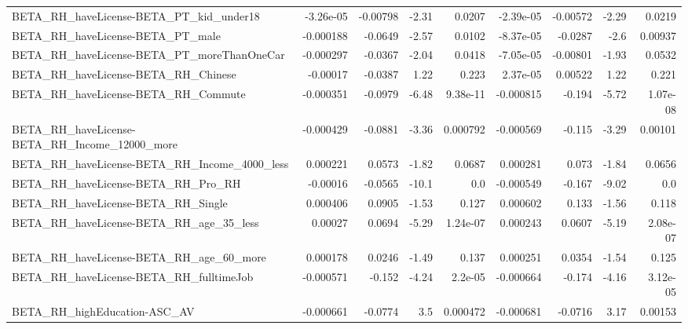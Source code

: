 \begin{tabular}{lrrrrrrrr}
BETA\_RH\_haveLicense-BETA\_PT\_kid\_under18            &   -3.26e-05 &     -0.00798 &     -2.31 &   0.0207 &  -2.39e-05 &    -0.00572 &        -2.29 &        0.0219 \\
BETA\_RH\_haveLicense-BETA\_PT\_male                   &   -0.000188 &      -0.0649 &     -2.57 &   0.0102 &  -8.37e-05 &     -0.0287 &         -2.6 &       0.00937 \\
BETA\_RH\_haveLicense-BETA\_PT\_moreThanOneCar         &   -0.000297 &      -0.0367 &     -2.04 &   0.0418 &  -7.05e-05 &    -0.00801 &        -1.93 &        0.0532 \\
BETA\_RH\_haveLicense-BETA\_RH\_Chinese                &    -0.00017 &      -0.0387 &      1.22 &    0.223 &   2.37e-05 &     0.00522 &         1.22 &         0.221 \\
BETA\_RH\_haveLicense-BETA\_RH\_Commute                &   -0.000351 &      -0.0979 &     -6.48 & 9.38e-11 &  -0.000815 &      -0.194 &        -5.72 &      1.07e-08 \\
BETA\_RH\_haveLicense-BETA\_RH\_Income\_12000\_more      &   -0.000429 &      -0.0881 &     -3.36 & 0.000792 &  -0.000569 &      -0.115 &        -3.29 &       0.00101 \\
BETA\_RH\_haveLicense-BETA\_RH\_Income\_4000\_less       &    0.000221 &       0.0573 &     -1.82 &   0.0687 &   0.000281 &       0.073 &        -1.84 &        0.0656 \\
BETA\_RH\_haveLicense-BETA\_RH\_Pro\_RH                 &    -0.00016 &      -0.0565 &     -10.1 &      0.0 &  -0.000549 &      -0.167 &        -9.02 &           0.0 \\
BETA\_RH\_haveLicense-BETA\_RH\_Single                 &    0.000406 &       0.0905 &     -1.53 &    0.127 &   0.000602 &       0.133 &        -1.56 &         0.118 \\
BETA\_RH\_haveLicense-BETA\_RH\_age\_35\_less            &     0.00027 &       0.0694 &     -5.29 & 1.24e-07 &   0.000243 &      0.0607 &        -5.19 &      2.08e-07 \\
BETA\_RH\_haveLicense-BETA\_RH\_age\_60\_more            &    0.000178 &       0.0246 &     -1.49 &    0.137 &   0.000251 &      0.0354 &        -1.54 &         0.125 \\
BETA\_RH\_haveLicense-BETA\_RH\_fulltimeJob            &   -0.000571 &       -0.152 &     -4.24 &  2.2e-05 &  -0.000664 &      -0.174 &        -4.16 &      3.12e-05 \\
BETA\_RH\_highEducation-ASC\_AV                       &   -0.000661 &      -0.0774 &       3.5 & 0.000472 &  -0.000681 &     -0.0716 &         3.17 &       0.00153 \\

\end{tabular}
